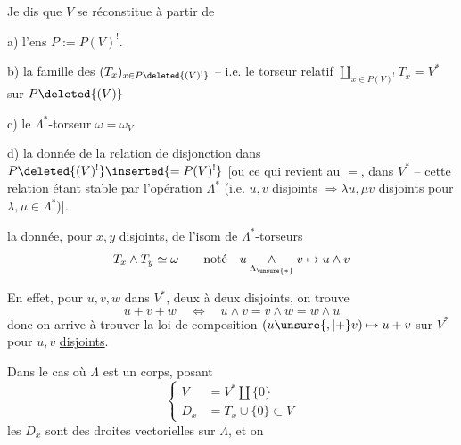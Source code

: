Je dis que  $V$ se réconstitue  à partir de

a) l'ens $P:=P(V)^!$.

b) la famille des  $(T_x)_{x\in P\deleted{(V)^!}}$ -- i.e. le torseur relatif $\coprod_{x\in P(V)^!} T_x=V^*$ sur $P\deleted{(V)}$

c) le $\Lambda^*$-torseur $\omega=\omega_V$

d) la donnée de la relation de disjonction dans $P\deleted{(V)^!}\inserted{=P(V)^!}$ [ou ce qui revient au $=$, dans $V^*$ -- cette relation étant stable par l'opération $\Lambda^*$ (i.e. $u,v$ disjoints $\Rightarrow\lambda u,\mu v$ disjoints pour $\lambda,\mu\in\Lambda^*$)].
\margin{Si $\Lambda$ est un corps, cette relation est la relation triviale $x\ne y$, et ne demande pas de donnée suppl. $\big[$}


 la donnée, pour $x,y$ disjoints, de l'isom de $\Lambda^*$-torseurs
\[
T_x\wedge T_y\simeq\omega\qquad\text{noté}\quad
u\mathbin{\underset{\Lambda_{\unsure{*}}}{\wedge}}v\mapsto u\wedge v
\]

En effet, pour  $u,v,w$ dans $V^*$, deux à deux disjoints, on trouve
\[
u+v+w\quad\Longleftrightarrow\quad u\wedge v=v\wedge w=w\wedge u
\]
donc on arrive à trouver la loi de composition  $(u\unsure{,|+}v)\mapsto u+v$ sur $V^*$ pour $u,v$ \uline{disjoints}.

 Dans le cas où $\Lambda$ est un corps, posant
\[
\left\{\begin{aligned}
V&=V^*\amalg\{0\}\\
D_x&=T_x\cup\{0\}\subset V
\end{aligned}\right.
\]
les $D_x$ sont des droites vectorielles sur $\Lambda$, et on
